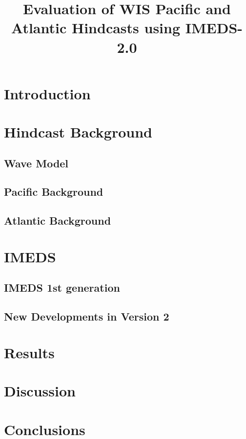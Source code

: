 \documentclass[12pt,letterpaper]{article}
\begin{document}
\title{Evaluation of WIS Pacific and Atlantic Hindcasts using IMEDS-2.0}
\maketitle
\section{Introduction}

\section{Hindcast Background}
\subsection{Wave Model}
\subsection{Pacific Background}
\subsection{Atlantic Background}

\section{IMEDS}
\subsection{IMEDS 1st generation}
\subsection{New Developments in Version 2}

\section{Results }

\section{Discussion}

\section{Conclusions}
\end{document}
